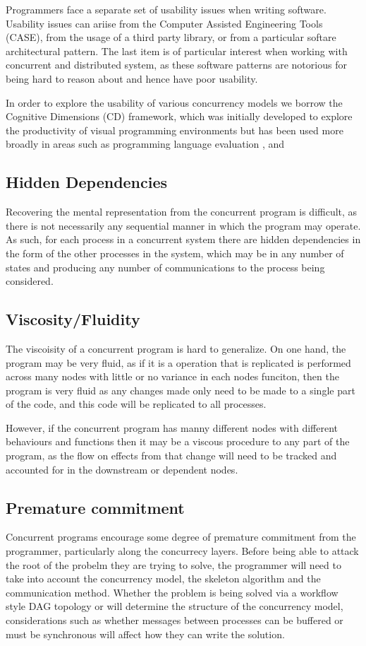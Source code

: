 \documentclass{sig-alternate}
\begin{document}
Programmers face a separate set of usability issues when writing software. Usability issues can ariise from the Computer Assisted Engineering Tools (CASE), from the usage of a third party library, or from a particular softare architectural pattern. The last item is of particular interest when working with concurrent and distributed system, as these software patterns are notorious for being hard to reason about and hence have poor usability.

In order to explore the usability of various concurrency models we borrow the Cognitive Dimensions \cite{green89:_cognit_dimen_notat} (CD) framework, which was initially developed to explore the productivity of visual programming environments but has been used more broadly in areas such as programming language evaluation \cite{enpl}, and 

\subsection{Hidden Dependencies}

Recovering the mental representation from the concurrent program is difficult, as there is not necessarily any sequential manner in which the program may operate. As such, for each process in a concurrent system there are hidden dependencies in the form of the other processes in the system, which may be in any number of states and producing any number of communications to the process being considered.

\subsection{Viscosity/Fluidity}
The viscoisity of a concurrent program is hard to generalize. On one hand, the program may be very fluid, as if it is a operation that is replicated is performed across many nodes with little or no variance in each nodes funciton, then the program is very fluid as any changes made only need to be made to a single part of the code, and this code will be replicated to all processes.

However, if the concurrent program  has manny different nodes with different behaviours and functions then it may be a viscous procedure to any part of the program, as the flow on effects from that change will need to be tracked and accounted for in the downstream or dependent nodes.

\subsection{Premature commitment}
Concurrent programs encourage some degree of premature commitment from the programmer, particularly along the concurrecy layers. Before being able to attack the root of the probelm they are trying to solve, the programmer will need to take into account the concurrency model, the skeleton algorithm and the communication method. Whether the problem is being solved via a workflow style DAG topology or will determine the structure of the concurrency model, considerations such as whether messages between processes can be buffered or must be synchronous will affect how they can write the solution.
\end{document}
